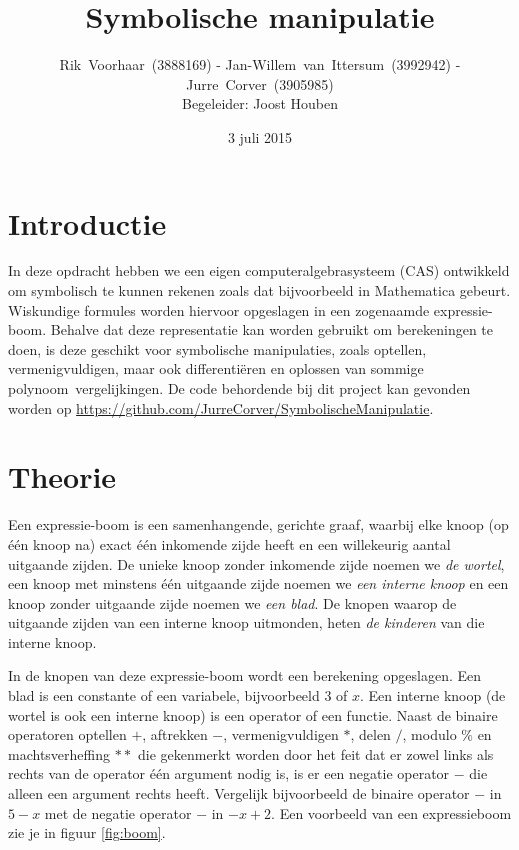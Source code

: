 \documentclass[a4paper]{article}
\title{Symbolische manipulatie}
\author{Rik~Voorhaar~(3888169) - Jan-Willem~van~Ittersum~(3992942) - Jurre~Corver~(3905985)\\
Begeleider: Joost Houben}
\date{3 juli 2015}
\begin{document}
\maketitle
\thispagestyle{empty}
\clearpage


\setcounter{page}{1}

\section{Introductie}
In deze opdracht hebben we een eigen computeralgebrasysteem (CAS) ontwikkeld om symbolisch te kunnen rekenen zoals dat bijvoorbeeld in Mathematica gebeurt. Wiskundige formules worden hiervoor opgeslagen in een zogenaamde expressie-boom. Behalve dat deze representatie kan worden gebruikt om berekeningen te doen, is deze geschikt voor symbolische manipulaties, zoals optellen, vermenigvuldigen, maar ook differenti\"eren en oplossen van sommige polynoom~vergelijkingen. De code behordende bij dit project kan gevonden worden op \url{https://github.com/JurreCorver/SymbolischeManipulatie}.


\section{Theorie}
Een expressie-boom is een samenhangende, gerichte graaf, waarbij elke knoop (op \'e\'en knoop na) exact \'e\'en inkomende zijde heeft en een willekeurig aantal uitgaande zijden. De unieke knoop zonder inkomende zijde noemen we \textit{de wortel}, een knoop met minstens \'e\'en uitgaande zijde noemen we \textit{een interne knoop} en een knoop zonder uitgaande zijde noemen we \textit{een blad}. De knopen waarop de uitgaande zijden van een interne knoop uitmonden, heten \textit{de kinderen} van die interne knoop.

In de knopen van deze expressie-boom wordt een berekening opgeslagen. Een blad is een constante of een variabele, bijvoorbeeld $3$ of $x$. Een interne knoop (de wortel is ook een interne knoop) is een operator of een functie. Naast de binaire operatoren optellen $+$, aftrekken $-$, vermenigvuldigen $*$, delen $/$, modulo $\%$ en machtsverheffing $**$ die gekenmerkt worden door het feit dat er zowel links als rechts van de operator \'e\'en argument nodig is, is er een negatie operator $-$ die alleen een argument rechts heeft. Vergelijk bijvoorbeeld de binaire operator $-$ in $5-x$ met de negatie operator $-$ in $-x+2$. Een voorbeeld van een expressieboom zie je in figuur \ref{fig:boom}. 
\end{document}
